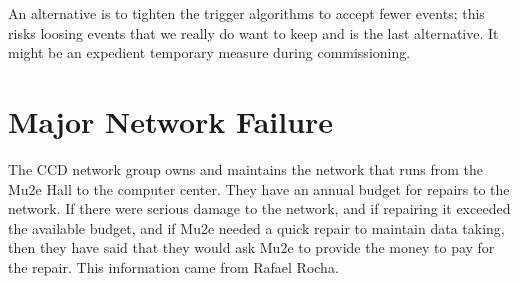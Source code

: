 An alternative is to tighten the trigger algorithms to accept fewer events;
this risks loosing events that we really do want to keep and is the last alternative.
It might be an expedient temporary measure during commissioning.

\section{Major Network Failure}
\label{sec:majorNetworkFailure}

The CCD network group owns and maintains the network that runs from the Mu2e Hall to the computer center.
They have an annual budget for repairs to the network.
If there were serious damage to the network,
and if repairing it exceeded the available budget,
and if Mu2e needed a quick repair to maintain data taking,
then they have said that they would ask Mu2e to provide the money to pay for the repair.
This information came from Rafael Rocha.


